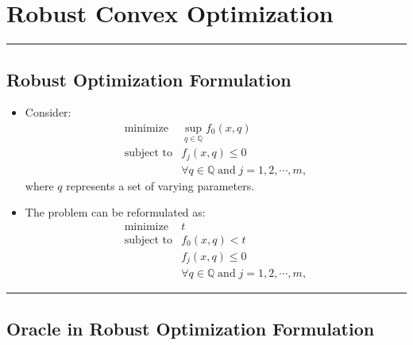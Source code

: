 \documentclass[]{article}
\begin{document}
\hypertarget{robust-convex-optimization}{%
\section{Robust Convex Optimization}\label{robust-convex-optimization}}

\begin{center}\rule{0.5\linewidth}{\linethickness}\end{center}

\hypertarget{robust-optimization-formulation}{%
\subsection{Robust Optimization
Formulation}\label{robust-optimization-formulation}}

\begin{itemize}
\item
  Consider: \[\begin{array}{ll}
      \text{minimize}   & \sup_{q \in {\mathbb{Q}}} f_0(x,q) \\
      \text{subject to} & f_j(x,q) \leq 0 \qquad \\
      & \forall q \in {\mathbb{Q}} \; \text{and} \; j = 1,2,\cdots,m,
    \end{array}\] where \(q\) represents a set of varying parameters.
\item
  The problem can be reformulated as: \[\begin{array}{ll}
      \text{minimize}   & t \\
      \text{subject to} & f_0(x,q) < t  \\
      & f_j(x,q) \leq 0 \\
      & \forall q \in {\mathbb{Q}} \; \text{and} \; j = 1,2,\cdots,m,
    \end{array}\]
\end{itemize}

\begin{center}\rule{0.5\linewidth}{\linethickness}\end{center}

\hypertarget{oracle-in-robust-optimization-formulation}{%
\subsection{Oracle in Robust Optimization
Formulation}\label{oracle-in-robust-optimization-formulation}}
\end{document}
